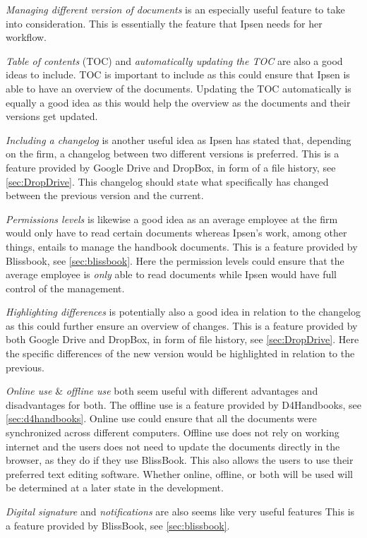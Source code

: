 \textit{Managing different version of documents} is an especially useful feature to take into consideration.
This is essentially the feature that Ipsen needs for her workflow.

\textit{Table of contents} (TOC) and \textit{automatically updating the TOC} are also a good ideas to include.
TOC is important to include as this could ensure that Ipsen is able to have an overview of the documents.
Updating the TOC automatically is equally a good idea as this would help the overview as the documents and their versions get updated.

\textit{Including a changelog} is another useful idea as Ipsen has stated that, depending on the firm, a changelog between two different versions is preferred.
This is a feature provided by Google Drive and DropBox, in form of a file history, see \cref{sec:DropDrive}.
This changelog should state what specifically has changed between the previous version and the current.

\textit{Permissions levels} is likewise a good idea as an average employee at the firm would only have to read certain documents whereas Ipsen's work, among other things, entails to manage the handbook documents.
This is a feature provided by Blissbook, see \cref{sec:blissbook}.
Here the permission levels could ensure that the average employee is \textit{only} able to read documents while Ipsen would have full control of the management.

\textit{Highlighting differences} is potentially also a good idea in relation to the changelog as this could further ensure an overview of changes.
This is a feature provided by both Google Drive and DropBox, in form of file history, see \cref{sec:DropDrive}.
Here the specific differences of the new version would be highlighted in relation to the previous.

\textit{Online use} \& \textit{offline use} both seem useful with different advantages and disadvantages for both.
The offline use is a feature provided by D4Handbooks, see \cref{sec:d4handbooks}.
Online use could ensure that all the documents were synchronized across different computers.
Offline use does not rely on working internet and the users does not need to update the documents directly in the browser, as they do if they use BlissBook.
This also allows the users to use their preferred text editing software.
Whether online, offline, or both will be used will be determined at a later state in the development.

\textit{Digital signature} and \textit{notifications} are also seems like very useful features
This is a feature provided by BlissBook, see \cref{sec:blissbook}.

